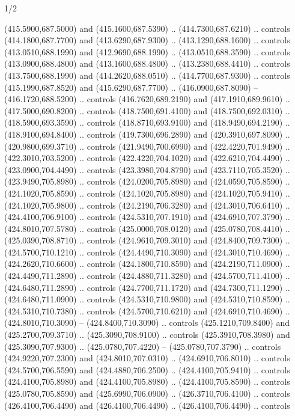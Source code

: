 \begin{flagdescription}{1/2}
\begin{scope}[xshift=0.5\flaglength]
\begin{scope}[scale=0.00745\flagwidth,xshift=-12.1mm,yshift=41.7mm]
\begin{scope}[y=0.80pt, x=0.80pt, yscale=-1, xscale=1, inner sep=0pt, outer sep=0pt]
\begin{scope}[cm={{1.33333,0.0,0.0,-1.33333,(0.0,114.66667)}}]
\begin{scope}[scale=0.100]
  (415.5900,687.5000) and (415.1600,687.5390) .. (414.7300,687.6210) .. controls
  (414.1800,687.7700) and (413.6290,687.9300) .. (413.1290,688.1600) .. controls
  (413.0510,688.1990) and (412.9690,688.1990) .. (413.0510,688.3590) .. controls
  (413.0900,688.4800) and (413.1600,688.4800) .. (413.2380,688.4410) .. controls
  (413.7500,688.1990) and (414.2620,688.0510) .. (414.7700,687.9300) .. controls
  (415.1990,687.8520) and (415.6290,687.7700) .. (416.0900,687.8090) --
  (416.1720,688.5200) .. controls (416.7620,689.2190) and (417.1910,689.9610) ..
  (417.5000,690.8200) .. controls (418.7500,691.4100) and (418.7500,692.0310) ..
  (418.5900,693.3590) .. controls (418.8710,693.9100) and (418.9490,694.2190) ..
  (418.9100,694.8400) .. controls (419.7300,696.2890) and (420.3910,697.8090) ..
  (420.9800,699.3710) .. controls (421.9490,700.6990) and (422.4220,701.9490) ..
  (422.3010,703.5200) .. controls (422.4220,704.1020) and (422.6210,704.4490) ..
  (423.0900,704.4490) .. controls (423.3980,704.8790) and (423.7110,705.3520) ..
  (423.9490,705.8980) .. controls (424.0200,705.8980) and (424.0590,705.8590) ..
  (424.1020,705.8590) .. controls (424.1020,705.8980) and (424.1020,705.9410) ..
  (424.1020,705.9800) .. controls (424.2190,706.3280) and (424.3010,706.6410) ..
  (424.4100,706.9100) .. controls (424.5310,707.1910) and (424.6910,707.3790) ..
  (424.8010,707.5780) .. controls (425.0000,708.0120) and (425.0780,708.4410) ..
  (425.0390,708.8710) .. controls (424.9610,709.3010) and (424.8400,709.7300) ..
  (424.5700,710.1210) .. controls (424.4490,710.3090) and (424.3010,710.4690) ..
  (424.2620,710.6600) .. controls (424.1800,710.8590) and (424.2190,711.0900) ..
  (424.4490,711.2890) .. controls (424.4880,711.3280) and (424.5700,711.4100) ..
  (424.6480,711.2890) .. controls (424.7700,711.1720) and (424.7300,711.1290) ..
  (424.6480,711.0900) .. controls (424.5310,710.9800) and (424.5310,710.8590) ..
  (424.5310,710.7380) .. controls (424.5700,710.6210) and (424.6910,710.4690) ..
  (424.8010,710.3090) -- (424.8400,710.3090) .. controls (425.1210,709.8400) and
  (425.2700,709.3710) .. (425.3090,708.9100) .. controls (425.3910,708.3980) and
  (425.3090,707.9300) .. (425.0780,707.4220) -- (425.0780,707.3790) .. controls
  (424.9220,707.2300) and (424.8010,707.0310) .. (424.6910,706.8010) .. controls
  (424.5700,706.5590) and (424.4880,706.2500) .. (424.4100,705.9410) .. controls
  (424.4100,705.8980) and (424.4100,705.8980) .. (424.4100,705.8590) .. controls
  (425.0780,705.8590) and (425.6990,706.0900) .. (426.3710,706.4100) .. controls
  (426.4100,706.4490) and (426.4100,706.4490) .. (426.4100,706.4490) .. controls

\end{scope}
\end{scope}
\end{scope}
\end{scope}
\end{scope}
\end{flagdescription}
